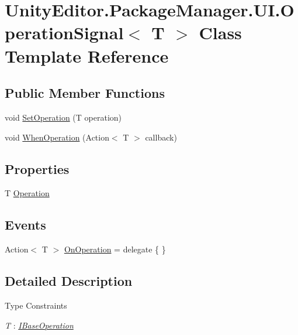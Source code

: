 \hypertarget{class_unity_editor_1_1_package_manager_1_1_u_i_1_1_operation_signal}{}\section{Unity\+Editor.\+Package\+Manager.\+U\+I.\+Operation\+Signal$<$ T $>$ Class Template Reference}
\label{class_unity_editor_1_1_package_manager_1_1_u_i_1_1_operation_signal}
\subsection*{Public Member Functions}
\begin{DoxyCompactItemize}
\item 
void \mbox{\hyperlink{class_unity_editor_1_1_package_manager_1_1_u_i_1_1_operation_signal_ac911f4bdd9a03fb51962d5c38565bde5}{Set\+Operation}} (T operation)
\item 
void \mbox{\hyperlink{class_unity_editor_1_1_package_manager_1_1_u_i_1_1_operation_signal_afb2e317a6d9ad8a4be476efb315c3a0b}{When\+Operation}} (Action$<$ T $>$ callback)
\end{DoxyCompactItemize}
\subsection*{Properties}
\begin{DoxyCompactItemize}
\item 
T \mbox{\hyperlink{class_unity_editor_1_1_package_manager_1_1_u_i_1_1_operation_signal_a33289ca18795c0626f2d668c37b2c8d4}{Operation}}
\end{DoxyCompactItemize}
\subsection*{Events}
\begin{DoxyCompactItemize}
\item 
Action$<$ T $>$ \mbox{\hyperlink{class_unity_editor_1_1_package_manager_1_1_u_i_1_1_operation_signal_aa1b2b9b713c8c6656653055a76fb3e5f}{On\+Operation}} = delegate \{ \}
\end{DoxyCompactItemize}


\subsection{Detailed Description}
\begin{Desc}
\item[Type Constraints]\begin{description}
\item[{\em T} : {\em \mbox{\hyperlink{interface_unity_editor_1_1_package_manager_1_1_u_i_1_1_i_base_operation}{I\+Base\+Operation}}}]\end{description}
\end{Desc}


